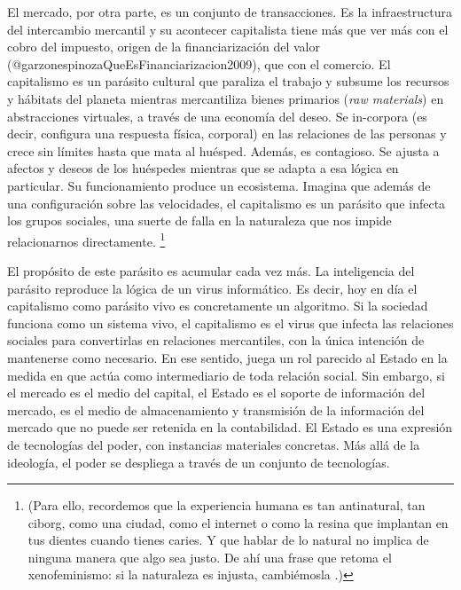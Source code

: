El mercado, por otra parte, es un conjunto de transacciones. Es la infraestructura del intercambio mercantil y su acontecer capitalista tiene más que ver más con el cobro del impuesto, origen de la financiarización del valor (@garzonespinozaQueEsFinanciarizacion2009), que con el comercio. El capitalismo es un parásito cultural que paraliza el trabajo y subsume los recursos y hábitats del planeta mientras mercantiliza bienes primarios (\emph{raw materials}) en abstracciones virtuales, a través de una economía del deseo. Se in-corpora (es decir, configura una respuesta física, corporal) en las relaciones de las personas y crece sin límites hasta que mata al huésped. Además, es contagioso. Se ajusta a afectos y deseos de los huéspedes mientras que se adapta a esa lógica en particular. Su funcionamiento produce un ecosistema. Imagina que además de una configuración sobre las velocidades, el capitalismo es un parásito que infecta los grupos sociales, una suerte de falla en la naturaleza que nos impide relacionarnos directamente. \footnote{(Para ello, recordemos que la experiencia humana es tan antinatural, tan ciborg, como una ciudad, como el internet o como la resina que implantan en tus dientes cuando tienes caries. Y que hablar de lo natural no implica de ninguna manera que algo sea justo. De ahí una frase que retoma el xenofeminismo: si la naturaleza es injusta, cambiémosla \autocite{hesterXenofeminism2018}.)}

El propósito de este parásito es acumular cada vez más. La inteligencia del parásito reproduce la lógica de un virus informático. Es decir, hoy en día el capitalismo como parásito vivo es concretamente un algoritmo. Si la sociedad funciona como un sistema vivo, el capitalismo es el virus que infecta las relaciones sociales para convertirlas en relaciones mercantiles, con la única intención de mantenerse como necesario. En ese sentido, juega un rol parecido al Estado en la medida en que actúa como intermediario de toda relación social. Sin embargo, si el mercado es el medio del capital, el Estado es el soporte de información del mercado, es el medio de almacenamiento y transmisión de la información del mercado que no puede ser retenida en la contabilidad. El Estado es una expresión de tecnologías del poder, con instancias materiales concretas. Más allá de la ideología, el poder se despliega a través de un conjunto de tecnologías.

